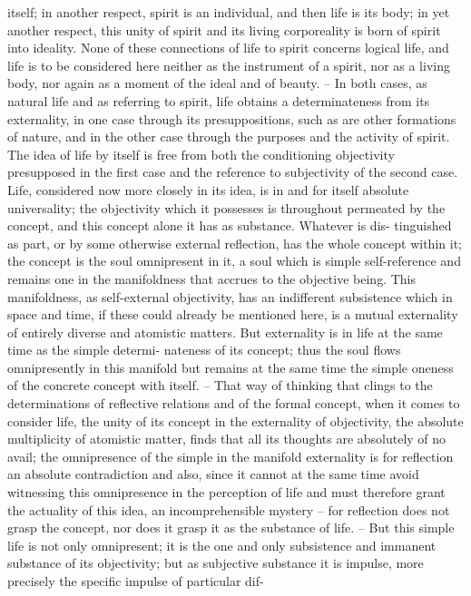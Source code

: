 itself; in another respect, spirit is an individual, and then life is its body; in
yet another respect, this unity of spirit and its living corporeality is born
of spirit into ideality. None of these connections of life to spirit concerns
logical life, and life is to be considered here neither as the instrument of
a spirit, nor as a living body, nor again as a moment of the ideal and of
beauty. – In both cases, as natural life and as referring to spirit, life obtains a
determinateness from its externality, in one case through its presuppositions,
such as are other formations of nature, and in the other case through the
purposes and the activity of spirit. The idea of life by itself is free from both
the conditioning objectivity presupposed in the first case and the reference
to subjectivity of the second case.
Life, considered now more closely in its idea, is in and for itself absolute
universality; the objectivity which it possesses is throughout permeated by
the concept, and this concept alone it has as substance. Whatever is dis-
tinguished as part, or by some otherwise external reflection, has the whole
concept within it; the concept is the soul omnipresent in it, a soul which is
simple self-reference and remains one in the manifoldness that accrues to
the objective being. This manifoldness, as self-external objectivity, has an
indifferent subsistence which in space and time, if these could already be
mentioned here, is a mutual externality of entirely diverse and atomistic
matters. But externality is in life at the same time as the simple determi-
nateness of its concept; thus the soul flows omnipresently in this manifold
but remains at the same time the simple oneness of the concrete concept
with itself. – That way of thinking that clings to the determinations of
reflective relations and of the formal concept, when it comes to consider
life, the unity of its concept in the externality of objectivity, the absolute
multiplicity of atomistic matter, finds that all its thoughts are absolutely of
no avail; the omnipresence of the simple in the manifold externality is for
reflection an absolute contradiction and also, since it cannot at the same
time avoid witnessing this omnipresence in the perception of life and must
therefore grant the actuality of this idea, an incomprehensible mystery – for
reflection does not grasp the concept, nor does it grasp it as the substance
of life. – But this simple life is not only omnipresent; it is the one and
only subsistence and immanent substance of its objectivity; but as subjective
substance it is impulse, more precisely the specific impulse of particular dif-
